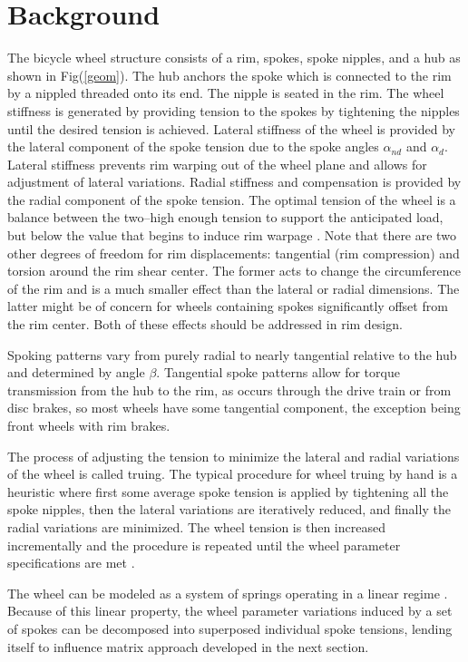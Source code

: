 \documentclass[journal]{IEEEtran}
\begin{document}
\section{Background}
The bicycle wheel structure consists of a rim, spokes, spoke nipples, and a hub as shown in Fig(\ref{geom}).  The hub anchors the spoke which is connected to the rim by a nippled threaded onto its end.  The nipple is seated in the rim. The wheel stiffness is generated by providing tension to the spokes by tightening the nipples until the desired tension is achieved. Lateral stiffness of the wheel is provided by the lateral component of the spoke tension due to the spoke angles $\alpha_{nd}$ and $\alpha_d$. Lateral stiffness prevents rim warping out of the wheel plane and allows for adjustment of lateral variations. Radial stiffness and compensation is provided by the radial component of the spoke tension. The optimal tension of the wheel is a balance between the two--high enough tension to support the anticipated load, but below the value that begins to induce rim warpage \cite{FordThesis}. Note that there are two other degrees of freedom for rim displacements:  tangential (rim compression) and torsion around the rim shear center.  The former acts to change the circumference of the rim and is a much smaller effect than the lateral or radial dimensions.  The latter might be of concern for wheels containing spokes significantly offset from the rim center. Both of these effects should be addressed in rim design. 

Spoking patterns vary from purely radial to nearly tangential relative to the hub and determined by angle $\beta$.  Tangential spoke patterns allow for torque transmission from the hub to the rim, as occurs through the drive train or from disc brakes, so most wheels have some tangential component, the exception being front wheels with rim brakes.

The process of adjusting the tension to minimize the lateral and radial variations of the wheel is called truing. The typical procedure for wheel truing by hand is a heuristic where first some average spoke tension is applied by tightening all the spoke nipples, then the lateral variations are iteratively reduced, and finally the radial variations are minimized. The wheel tension is then increased incrementally and the procedure is repeated until the wheel parameter specifications are met \cite{Brandt}.

The wheel can be modeled as a system of springs operating in a linear regime \cite{FordThesis}. Because of this linear property, the wheel parameter variations induced by a set of spokes can be decomposed into superposed individual spoke tensions, lending itself to influence matrix approach developed in the next section.
\end{document}
